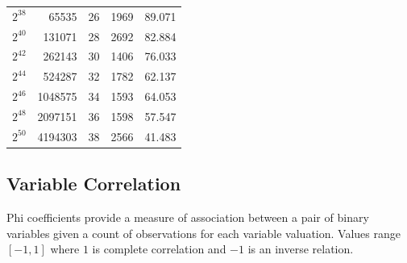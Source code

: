 \documentclass[runningheads]{llncs}
\begin{document}
\begin{table}[!h]
\begin{tabular}{rrrrr}
		\rowcolor[HTML]{FFFFFF} 
		$2^{38}$                                                              & 65535                                                                            & 26                           & 1969                      & 89.071                       \\
		\rowcolor[HTML]{FFFFFF} 
		$2^{40}$                                                              & 131071                                                                           & 28                           & 2692                      & 82.884                       \\
		\rowcolor[HTML]{FFFFFF} 
		$2^{42}$                                                              & 262143                                                                           & 30                           & 1406                      & 76.033                       \\
		\rowcolor[HTML]{FFFFFF} 
		$2^{44}$                                                              & 524287                                                                           & 32                           & 1782                      & 62.137                       \\
		\rowcolor[HTML]{FFFFFF} 
		$2^{46}$                                                              & 1048575                                                                          & 34                           & 1593                      & 64.053                       \\
		\rowcolor[HTML]{FFFFFF} 
		$2^{48}$                                                              & 2097151                                                                          & 36                           & 1598                      & 57.547                       \\
		\rowcolor[HTML]{FFFFFF} 
		$2^{50}$                                                              & 4194303                                                                          & 38                           & 2566                      & 41.483                       \\ \hline
	\end{tabular}
\end{table}

\subsection{Variable Correlation}

Phi coefficients provide a measure of association between a pair of binary variables given a count of observations for each variable valuation.  
 Values range $[-1,1]$ where $1$ is complete correlation and $-1$ is an inverse relation.  
 
\end{document}
